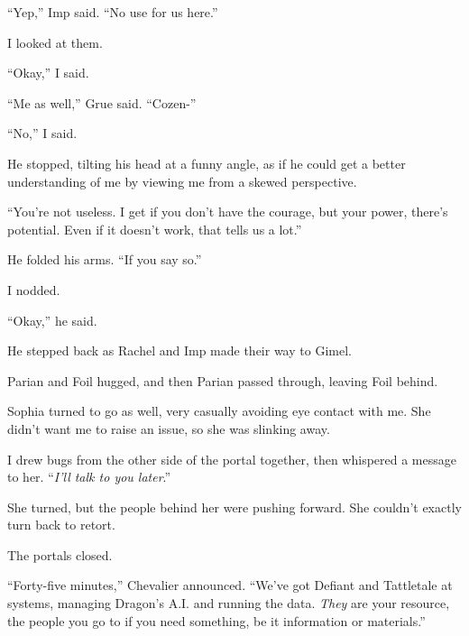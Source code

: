 ``Yep,'' Imp said.  ``No use for us here.''



I looked at them.



``Okay,'' I said.



``Me as well,'' Grue said.  ``Cozen-''



``No,'' I said.



He stopped, tilting his head at a funny angle, as if he could get a better understanding of me by viewing me from a skewed perspective.



``You're not useless.  I get if you don't have the courage, but your power, there's potential.  Even if it doesn't work, that tells us a lot.''



He folded his arms.  ``If you say so.''



I nodded.



``Okay,'' he said.



He stepped back as Rachel and Imp made their way to Gimel.



Parian and Foil hugged, and then Parian passed through, leaving Foil behind.



Sophia turned to go as well, very casually avoiding eye contact with me.  She didn't want me to raise an issue, so she was slinking away.



I drew bugs from the other side of the portal together, then whispered a message to her.  ``\emph{I'll talk to you later}.''



She turned, but the people behind her were pushing forward.  She couldn't exactly turn back to retort.



The portals closed.



``Forty-five minutes,'' Chevalier announced.  ``We've got Defiant and Tattletale at systems, managing Dragon's A.I. and running the data.  \emph{They} are your resource, the people you go to if you need something, be it information or materials.''




